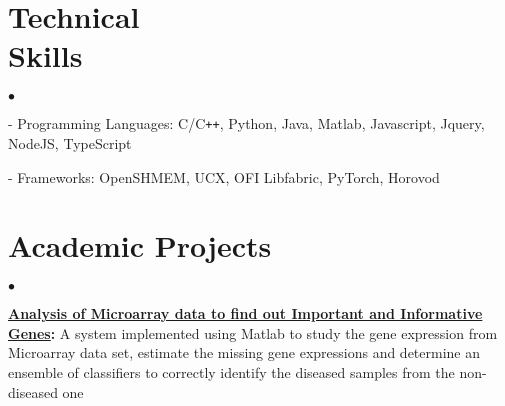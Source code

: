 \documentclass[margin,line]{res}
\newenvironment{list2}{
  \begin{list}{$\bullet$}{%
      \setlength{\itemsep}{0in}
      \setlength{\parsep}{0in} \setlength{\parskip}{0in}
      \setlength{\topsep}{0in} \setlength{\partopsep}{0in} 
      \setlength{\leftmargin}{0.2in}}}{\end{list}}
\begin{document}
\begin{resume}
\section{\sc Technical \\Skills}
\begin{list2}
	\item[ - ] Programming Languages: C/C\texttt{++}, Python, Java, Matlab, 
	Javascript, Jquery, NodeJS, TypeScript
	\item[ - ] Frameworks: OpenSHMEM, UCX, OFI 
	Libfabric, PyTorch,
	Horovod%
\end{list2}

\vspace*{-.18in}

\section{\sc Academic Projects}
\begin{list2}
\item {\bf 
\href{https://github.com/sb17v/Analysis-of-Microarray-Data-to-find-out-Important-and-Informative-Genes}{Analysis
 of Microarray data to find out Important and Informative 
Genes}:} A system implemented using Matlab to study the gene expression from
Microarray data set, estimate the missing gene expressions and determine an 
ensemble of classifiers to correctly identify the diseased samples
from the non-diseased one
\end{list2}


\end{resume}
\end{document}
